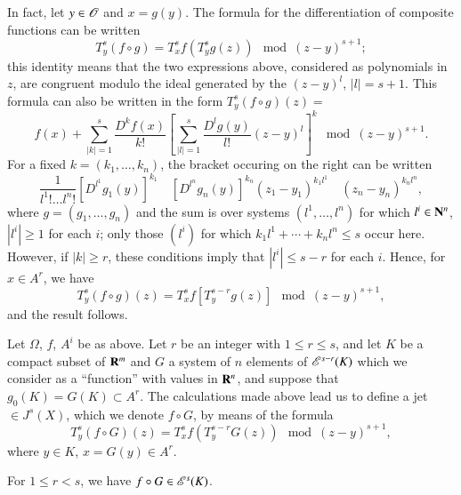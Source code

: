 In fact, let $y\in \mathscr{O}$ and $x=g(y)$. The formula for the differentiation of composite functions can be written
$$
T^{s}_{y}(f\circ g)=T^{s}_{x}f(T^{s}_{y}g(z))\mod (z-y)^{s+1};
$$
this identity means that the two expressions above, considered as polynomials in $z$, are congruent modulo the ideal generated by the $(z-y)^{l}$, $|l|=s+1$. This formula can also be written in the form $T^{s}_{y}(f\circ g)(z)=$
$$
f(x)+\sum\limits^{s}_{|k|=1}\dfrac{D^{k}f(x)}{k!}\left[\sum\limits^{s}_{|l|=1}\dfrac{D^{l}g(y)}{l!}(z-y)^{l}\right]^{k}\mod (z-y)^{s+1}.
$$
For a fixed $k=(k_{1},\ldots,k_{n})$, the bracket occuring on the right can be written
$$
\dfrac{1}{l^{1}!\ldots l^{n}!}[D^{l^{1}}g_{1}(y)]^{k_{1}}\quad [D^{l^{n}}g_{n}(y)]^{k_{n}}(z_{1}-y_{1})^{k_{1}l^{1}}\quad (z_{n}-y_{n})^{k_{n}l^{n}},
$$
where $g=(g_{1},\ldots,g_{n})$ and the sum is over systems $(l^{1},\ldots,l^{n})$ for which $l^{i}\in \mathbf{N}^{n}$, $|l^{i}|\geq 1$ for each $i$; only those $(l^{i})$ for which $k_{1}l^{1}+\cdots + k_{n}l^{n}\leq s$ occur here. However, if $|k|\geq r$, these conditions imply that $|l^{i}|\leq s-r$ for each $i$. Hence, for $x\in A^{r}$, we have 
$$
T^{s}_{y}(f\circ g)(z)=T^{s}_{x}f[T^{s-r}_{y}g(z)]\mod (z-y)^{s+1},
$$\pageoriginale
and the result follows.

Let $\Omega$, $f$, $A^{i}$ be as above. Let $r$ be an integer with $1\leq r\leq s$, and let $K$ be a compact subset of $\mathbf{R}^{m}$ and $G$ a system of $n$ elements of $\mathscr{E}^{s-r}(K)$ which we consider as a ``function'' with values in $\mathbf{R}^{n}$, and suppose that $g_{0}(K)=G(K)\subset A^{r}$. The calculations made above lead us to define a jet $\in J^{s}(X)$, which we denote $f\circ G$, by means of the formula
$$
T^{s}_{y}(f\circ G)(z)=T^{s}_{x}f(T^{s-r}_{y}G(z))\mod (z-y)^{s+1},
$$
where $y\in K$, $x=G(y)\in A^{r}$.

\begin{theorem}\label{chap1-thm6.1}
For $1\leq r<s$, we have $f\circ G\in \mathscr{E}^{s}(K)$.
\end{theorem}

